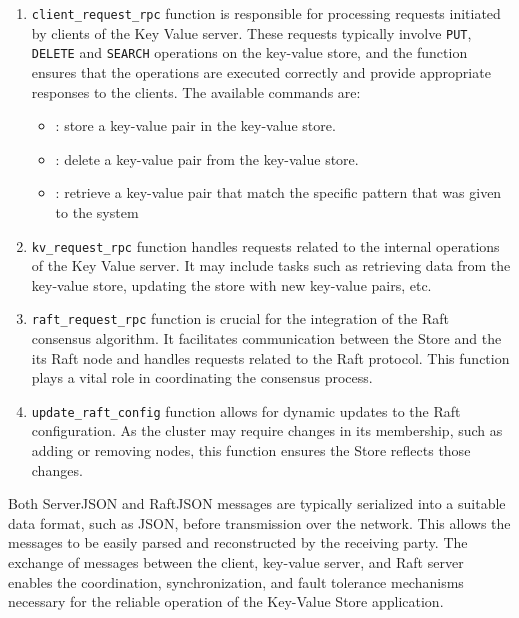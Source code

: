 \documentclass{article}
\begin{document}
\begin{enumerate}
	\item \texttt{client\_request\_rpc} function is responsible for processing requests initiated by
	clients of the Key Value server. These requests typically involve \texttt{PUT}, \texttt{DELETE} and
	\texttt{SEARCH} operations on the key-value store, and the function ensures that the operations are
	executed correctly and provide appropriate responses to the clients. The available commands are:
		\begin{itemize}
    		\item {}: store a key-value pair in the key-value store.
    		\item {}: delete a key-value pair from the key-value store.
    		\item {}: retrieve a key-value pair that match the specific pattern 
    		that was given to the system
		\end{itemize}
	\item \texttt{kv\_request\_rpc} function handles requests related to the internal operations of the Key
	Value server. It may include tasks such as retrieving data from the key-value store, updating the store
	with new key-value pairs, etc.

	\item \texttt{raft\_request\_rpc} function is crucial for the integration of the Raft consensus algorithm.
	It facilitates communication between the Store and the its Raft node and handles requests related to the
	Raft protocol. This function plays a vital role in coordinating the consensus process.
		

	\item \texttt{update\_raft\_config} function allows for dynamic updates to the Raft configuration. As the
	cluster may require changes in its membership, such as adding or removing nodes, this function ensures the
	Store reflects those changes.

\end{enumerate}

Both ServerJSON and RaftJSON messages are typically serialized into a suitable data format,
such as JSON, before transmission over the network. This allows the messages to be easily
parsed and reconstructed by the receiving party. The exchange of messages between the client,
key-value server, and Raft server enables the coordination, synchronization, and fault tolerance
mechanisms necessary for the reliable operation of the Key-Value Store application.
\end{document}
